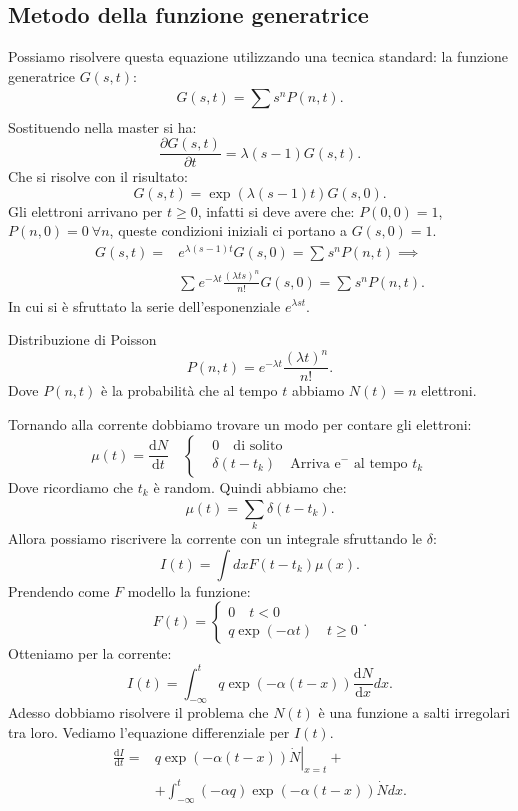 \subsection{Metodo della funzione generatrice}%
Possiamo risolvere questa equazione utilizzando una tecnica standard: la funzione generatrice $G(s,t)$:
\[
    G(s,t) =\sum_{}^{} s^nP(n,t) 
.\] 
Sostituendo nella master si ha:
\[
    \frac{\partial G(s,t)}{\partial t} = \lambda (s-1) G(s,t) 
.\] 
Che si risolve con il risultato:
\[
    G(s,t) = \exp\left(\lambda (s-1) t\right)G(s,0) 
.\] 
Gli elettroni arrivano per $t\ge 0$, infatti si deve avere che: $P(0,0)=1$, $P(n,0) = 0 \ \forall n$, queste condizioni iniziali ci portano a $G(s,0) = 1$.
\[\begin{aligned}
    G(s,t) =& e^{\lambda (s-1) t}G(s,0) = \sum_{}^{} s^n P(n,t) \implies  \\
		&\sum_{}^{} e^{-\lambda t}\frac{\left(\lambda ts\right)^n }{n!}G(s,0)  = \sum_{}^{} s^nP(n,t) 
.\end{aligned}\]
In cui si è sfruttato la serie dell'esponenziale $e^{\lambda st}$.
\begin{redbox}{Distribuzione di Poisson}
    \[
	P(n,t)= e^{-\lambda t}\frac{\left(\lambda t\right)^{n}}{n!}
    .\] 
    Dove $P(n,t)$ è la probabilità che al tempo $t$ abbiamo $N(t) =n$ elettroni.
\end{redbox}
\noindent
Tornando alla corrente dobbiamo trovare un modo per contare gli elettroni:
\[
    \mu (t) = \frac{\text{d} N}{\text{d} t} \quad
    \begin{cases}
	&0 \quad \text{di solito}\\
	&\delta (t-t_k) \quad \text{Arriva e$^-$ al tempo }t_k
    \end{cases}
\] 
Dove ricordiamo che $t_k$ è random.
Quindi abbiamo che: 
\[
    \mu (t) = \sum_{k}^{} \delta (t-t_k) 
.\] 
Allora possiamo riscrivere la corrente con un integrale sfruttando le $\delta$:
\[
    I(t) = \int dx F(t-t_k) \mu (x) 
.\] 
Prendendo come $F$ modello la funzione:
\[
    F(t) = \begin{cases}
        0 \quad t<0\\
	q \exp\left(-\alpha t\right) \quad t \ge 0
    \end{cases}
.\] 
Otteniamo per la corrente:
\[
    I(t) = \int_{- \infty}^{t} q \exp\left(-\alpha (t-x) \right) \frac{\text{d} N}{\text{d} x} dx 
.\] 
Adesso dobbiamo risolvere il problema che $N(t)$ è una funzione a salti irregolari tra loro. Vediamo l'equazione differenziale per $I(t)$.
\[\begin{aligned}
    \frac{\text{d} I}{\text{d} t} =& q\exp\left(-\alpha (t-x)\right)\left.\dot{N}\right|_{x=t} + \\
				   &+\int_{-\infty}^{t} \left(-\alpha q\right)\exp\left(-\alpha (t-x)\right)\dot{N}dx 
.\end{aligned}\]
